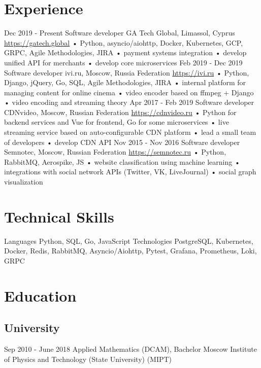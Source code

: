 \documentclass[12pt,a4paper]{moderncv}
\begin{document}
\maketitle

\section{Experience}
\cventry
  {Dec 2019 - Present}
  {Software developer}
  {GA Tech Global, Limassol, Cyprus}
  {\newline{}\url{https://gatech.global}}{}
  {
    • Python, asyncio/aiohttp, Docker, Kubernetes, GCP, GRPC, Agile Methodologies, JIRA\newline{}
    • payment systems integration\newline{}
    • develop unified API for merchants\newline{}
    • develop core microservices
  }
\cventry
  {Feb 2019 - Dec 2019}
  {Software developer}
  {ivi.ru, Moscow, Russia Federation}
  {\newline{}\url{https://ivi.ru}}{}
  {
    • Python, Django, jQuery, Go, SQL, Agile Methodologies, JIRA\newline{}
    • internal platform for managing content for online cinema\newline{}
    • video encoder based on ffmpeg + Django\newline{}
    • video encoding and streaming theory
   }
\cventry
  {Apr 2017 - Feb 2019}
  {Software developer}
  {CDNvideo, Moscow, Russian Federation}
  {\newline{}\url{https://cdnvideo.ru}}{}
  {
    • Python for backend services and Vue for frontend, Go for some microservices\newline{}
    • live streaming service based on auto-configurable CDN platform\newline{}
    • lead a small team of developers\newline{}
    • develop CDN API
   }
\cventry
  {Nov 2015 - Nov 2016}
  {Software developer}
  {Semnotec, Moscow, Russian Federation}
  {\newline{}\url{https://semnotec.ru}}{}
  {
    • Python, RabbitMQ, Aerospike, JS\newline{}
    • website classification using machine learning\newline{}
    • integrations with social network APIs (Twitter, VK, LiveJournal)\newline{}
    • social graph visualization
   }

\section{Technical Skills}
\cvline
  {Languages}{
    Python,
    SQL,
    Go,
    JavaScript
  }
\cvline
  {Technologies}{
    PostgreSQL,
    Kubernetes,
    Docker,
    Redis,
    RabbitMQ,
    Asyncio/Aiohttp,
    Pytest,
    Grafana,
    Prometheus,
    Loki,
    GRPC
  }

\section{Education}
  \subsection{University}
  \cventry
    {Sep 2010 - June 2018}
    {Applied Mathematics (DCAM), Bachelor}
    {Moscow Institute of Physics and Technology (State University) (MIPT)}
    {}{}{}
\end{document}
